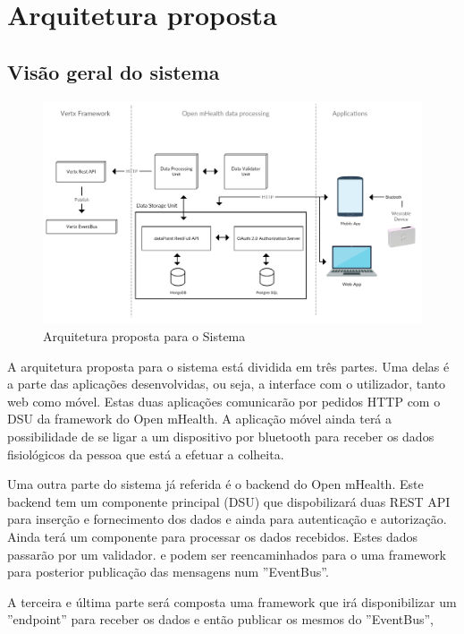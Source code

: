 \chapter{Arquitetura proposta}

\section{Visão geral do sistema}


\begin{figure}[H]
  \centering
  \includegraphics[width=1\textwidth]{imgs/arch-product.png}
  \caption[Arquitetura proposta para o Sistema]{Arquitetura proposta para o Sistema}
  
  \label{f:product-arch}
\end{figure}

A arquitetura proposta para o sistema está dividida em três partes. Uma delas é a parte das aplicações desenvolvidas, ou seja, a interface com o utilizador, tanto web como móvel. Estas duas aplicações comunicarão por pedidos \gls{HTTP} com o \gls{DSU} da framework do Open mHealth. A aplicação móvel ainda terá a possibilidade de se ligar a um dispositivo por bluetooth para receber os dados fisiológicos da pessoa que está a efetuar a colheita.
\par 
Uma outra parte do sistema já referida é o backend do Open mHealth. Este backend tem um componente principal (\gls{DSU}) que dispobilizará duas \gls{REST} \gls{API} para inserção e fornecimento dos dados e ainda para autenticação e autorização. Ainda terá um componente para processar os dados recebidos. Estes dados passarão por um validador. e podem ser reencaminhados para o uma framework para posterior publicação das mensagens num ''EventBus''.
\par
A terceira e última parte será composta uma framework que irá disponibilizar um ''endpoint'' para receber os dados e então publicar os mesmos do ''EventBus'',
